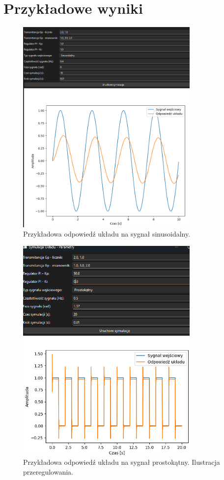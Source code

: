 \documentclass[12pt,a4paper]{article}
\begin{document}
\section{Przykładowe wyniki}
\begin{figure}[h!]
    \centering
    \includegraphics[width=0.8\textwidth]{wykres1.png}
    \caption{Przykładowa odpowiedź układu na sygnał sinusoidalny.}
\end{figure}

\begin{figure}[h!]
    \centering
    \includegraphics[width=0.8\textwidth]{wykres3.png}
    \caption{Przykładowa odpowiedź układu na sygnał prostokątny. Ilustracja przeregulowania.}
\end{figure}
\end{document}
